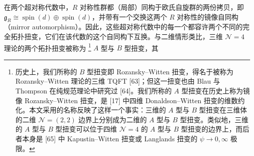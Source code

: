 在两个超对称代数中，$R$ 对称性群都（局部）同构于欧氏自旋群的两份拷贝，即 $\mathfrak{g}_R \cong \operatorname{spin}(d)\oplus\operatorname{spin}(d)$，并带有一个交换这两个 $R$ 对称性的镜像自同构（mirror automorphism）。因此，这些超对称代数中的每一个都容许两个不同的完全拓扑扭变，它们在该代数的这个自同构下互换。与二维情形类比，三维 $\mathcal{N}=4$ 理论的两个拓扑扭变被称为
\footnote{历史上，我们所称的 $B$ 型扭变即 Rozansky–Witten 扭变，得名于被称为 Rozansky–Witten 理论的三维 TQFT [63]；但这一扭变也由 Blau 与 Thompson 在纯规范理论中研究过 [64]。我们所称的 $A$ 型扭变在历史上称为镜像 Rozansky–Witten 扭变，是 [17] 中四维 Donaldson–Witten 扭变的维数约化。本文采用的名称反映了这样一个事实：三维的 $A$ 型与 $B$ 型扭变在三维体的二维 $\mathcal{N}=(2,2)$ 边界上分别成为二维的 $A$ 型与 $B$ 型扭变。类似地，三维的 $A$ 型与 $B$ 型扭变可以位于四维 $\mathcal{N}=4$ 的 $A$ 型与 $B$ 型扭变的边界上，而后者本身是 [65] 中 Kapustin–Witten 扭变或 Langlands 扭变的 $\psi\to 0,\infty$ 极限。}
$A$ 型与 $B$ 型扭变，其
